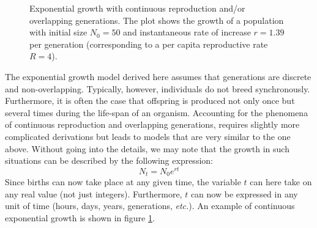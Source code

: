 \documentclass[11pt,a4paper]{book}
\newcommand{\etc}{\emph{etc.}}
\begin{document}
%
\begin{figure}[!t]
\begin{center}
\caption{\small Exponential growth with continuous reproduction and/or overlapping generations. The plot shows the growth of a population with initial size $N_0=50$ and instantaneous rate of increase $r=1.39$ per generation (corresponding to a per capita reproductive rate $R=4$).}
\label{FIGcontexpgrowth}
\end{center}
\end{figure}
%

The exponential growth model derived here assumes that generations are discrete and non-overlap\-ping. Typically, however, individuals do not breed synchronously. Furthermore, it is often the case that offspring is produced not only once but several times during the life-span of an organism. Accounting for the phenomena of continuous reproduction and overlapping generations, requires slightly more complicated derivations but leads to models that are very similar to the one above. Without going into the details, we may note that the growth in such situations can be described by the following expression:
%
\begin{equation}
\label{ }
N_t = N_0  e^{rt}
\end{equation}
%
Since births can now take place at any given time, the variable $t$ can here take on any real value (not just integers). Furthermore, $t$ can now be expressed in any unit of time (hours, days, years, generations, \etc). An example of continuous exponential growth is shown in figure \ref{FIGcontexpgrowth}. 
\end{document}
